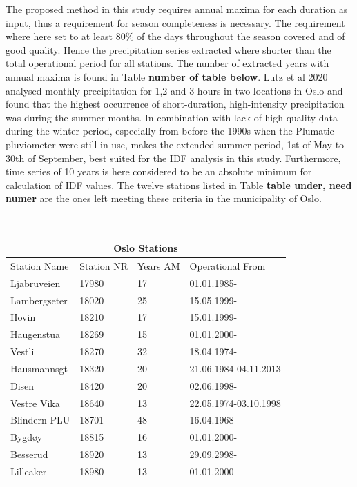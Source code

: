 The proposed method in this study requires annual maxima for each duration as input, thus a requirement for season completeness is necessary. The requirement where here set to at least 80\% of the days throughout the season covered and of good quality. Hence the precipitation series extracted where shorter than the total operational period for all stations. The number of extracted years with annual maxima is found in Table \textbf{number of table below}. Lutz et al 2020 analysed monthly precipitation for 1,2 and 3 hours in two locations in Oslo and found that the highest occurrence of short-duration, high-intensity precipitation was during the summer months. In combination with lack of high-quality data during the winter period, especially from before the 1990s when the Plumatic pluviometer were still in use, makes the extended summer period, 1st of May to 30th of September, best suited for the IDF analysis in this study. Furthermore, time series of 10 years is here considered to be an absolute minimum for calculation of IDF values. The twelve stations listed in Table \textbf{table under, need numer} are the ones left meeting these criteria in the municipality of Oslo.   

\\

\begin{center}
\begin{tabular}{ |p{3cm}||p{3cm}|p{3cm}|p{3cm}|  }
\hline
\multicolumn{4}{|c|}{Oslo Stations} \\
\hline
 Station Name & Station NR & Years AM & Operational From\\
 Ljabruveien & 17980  & 17 &  01.01.1985-\\
 Lambergseter & 18020 & 25 & 15.05.1999-\\
 Hovin & 18210 & 17 & 15.01.1999-\\
 Haugenstua & 18269 & 15 & 01.01.2000-\\
 Vestli & 18270 & 32 & 18.04.1974-\\
 Hausmannsgt & 18320 & 20 & 21.06.1984-04.11.2013\\
 Disen & 18420 & 20 & 02.06.1998-\\
 Vestre Vika & 18640 & 13 & 22.05.1974-03.10.1998\\
 Blindern PLU & 18701 & 48 & 16.04.1968-\\
 Bygdøy & 18815 & 16 & 01.01.2000-\\
 Besserud & 18920 & 13 & 29.09.2998-\\
 Lilleaker & 18980 & 13 & 01.01.2000-   
\end{tabular}
\end{center}

